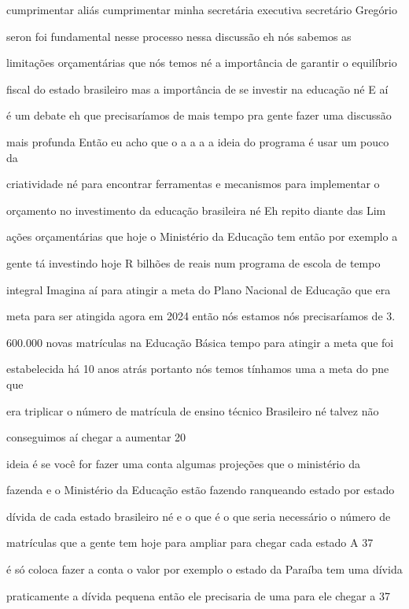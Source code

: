 \documentclass[a4paper,12pt]{article}
\begin{document}
cumprimentar aliás cumprimentar minha secretária executiva secretário Gregório

seron foi fundamental nesse processo nessa discussão eh nós sabemos as

limitações orçamentárias que nós temos né a importância de garantir o equilíbrio

fiscal do estado brasileiro mas a importância de se investir na educação né E aí

é um debate eh que precisaríamos de mais tempo pra gente fazer uma discussão

mais profunda Então eu acho que o a a a a ideia do programa é usar um pouco da

criatividade né para encontrar ferramentas e mecanismos para implementar o

orçamento no investimento da educação brasileira né Eh repito diante das Lim

ações orçamentárias que hoje o Ministério da Educação tem então por exemplo a

gente tá investindo hoje R bilhões de reais num programa de escola de tempo

integral Imagina aí para atingir a meta do Plano Nacional de Educação que era

meta para ser atingida agora em 2024 então nós estamos nós precisaríamos de 3.

600.000 novas matrículas na Educação Básica tempo para atingir a meta que foi

estabelecida há 10 anos atrás portanto nós temos tínhamos uma a meta do pne que

era triplicar o número de matrícula de ensino técnico Brasileiro né talvez não

conseguimos aí chegar a aumentar 20%

ideia é se você for fazer uma conta algumas projeções que o ministério da

fazenda e o Ministério da Educação estão fazendo ranqueando estado por estado

dívida de cada estado brasileiro né e o que é o que seria necessário o número de

matrículas que a gente tem hoje para ampliar para chegar cada estado A 37%

é só coloca fazer a conta o valor por exemplo o estado da Paraíba tem uma dívida

praticamente a dívida pequena então ele precisaria de uma para ele chegar a 37%
\end{document}
